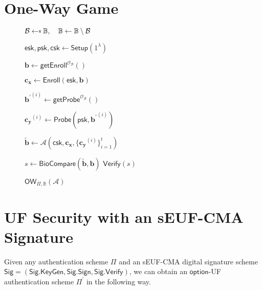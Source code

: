
\newpage


\section{One-Way Game}

\begin{figure}[h]
\centering

	\begin{minipage}[t]{0.55\textwidth}
	\begin{algorithm}[H]
	\caption{$\textsf{OW}_{\Pi, \mathbb{B}}(\mathcal{A})$}
	\label{alg:ow_game}
	\begin{algorithmic}[1]

		\State $\mathcal{B} \getsdollar \mathbb{B}, \quad \mathbb{B} \gets \mathbb{B} \setminus \mathcal{B}$

		\State $\textsf{esk}, \textsf{psk}, \textsf{csk} \gets \textsf{Setup}(1^\lambda)$

		\State $\mathbf{b} \gets \textsf{getEnroll}^{\mathcal{O}_{\mathcal{B}}}()$

		\State $\mathbf{c_x} \gets \textsf{Enroll}(\textsf{esk}, \mathbf{b})$


			\State ${\mathbf{b}^\prime}^{(i)} \gets \textsf{getProbe}^{\mathcal{O}_{\mathcal{B}}}() $
		
			\State $\mathbf{c_y}^{(i)} \gets \textsf{Probe}( \textsf{psk}, {\mathbf{b}^\prime}^{(i)} )$

		\EndFor
	
			\State $\mathbf{\tilde{b}} \gets \mathcal{A}( \textsf{csk}, \mathbf{c_x}, \{ \mathbf{c_y}^{(i)} \}_{i=1}^t )$

		\State $s \gets \textsf{BioCompare}( \mathbf{\tilde{b}}, \mathbf{b})$
		\State \Return $ \textsf{Verify}(s) $
	\end{algorithmic}
	\end{algorithm}
	\end{minipage}

\label{fig:ow_game}
\end{figure}


\section{UF Security with an sEUF-CMA Signature}

Given any authentication scheme $\Pi$ and an sEUF-CMA digital signature scheme $\textsf{Sig} = (\textsf{Sig.KeyGen}, \textsf{Sig.Sign}, \textsf{Sig.Verify})$, we can obtain an $\textsf{option}$-UF authentication scheme $\Pi^\prime$ in the following way.


